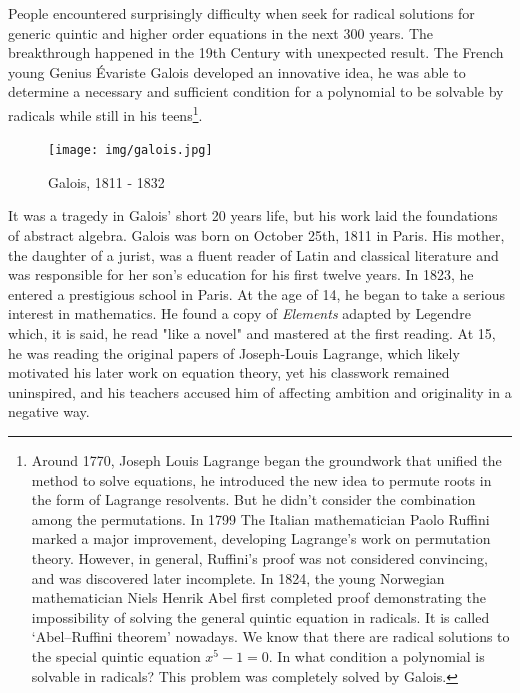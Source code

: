 \documentclass[b5paper]{article}
\begin{document}
People encountered surprisingly difficulty when seek for radical solutions for generic quintic and higher order equations in the next 300 years. The breakthrough happened in the 19th Century with unexpected result. The French young Genius Évariste Galois developed an innovative idea, he was able to determine a necessary and sufficient condition for a polynomial to be solvable by radicals while still in his teens\footnote{Around 1770, Joseph Louis Lagrange began the groundwork that unified the method to solve equations, he introduced the new idea to permute roots in the form of Lagrange resolvents. But he didn't consider the combination among the permutations. In 1799 The Italian mathematician Paolo Ruffini marked a major improvement, developing Lagrange's work on permutation theory. However, in general, Ruffini's proof was not considered convincing, and was discovered later incomplete. In 1824, the young Norwegian mathematician Niels Henrik Abel first completed proof demonstrating the impossibility of solving the general quintic equation in radicals. It is called `Abel–Ruffini theorem' nowadays. We know that there are radical solutions to the special quintic equation $x^5-1=0$. In what condition a polynomial is solvable in radicals? This problem was completely solved by Galois\cite{Wiki-Galois-theory}.}.

\begin{figure}[htbp]
 \centering
 \texttt{[image: img/galois.jpg]}
 \captionsetup{labelformat=empty}
 \caption{Galois, 1811 - 1832}
 \label{fig:Galois}
\end{figure}

It was a tragedy in Galois' short 20 years life, but his work laid the foundations of abstract algebra. Galois was born on October 25th, 1811 in Paris. His mother, the daughter of a jurist, was a fluent reader of Latin and classical literature and was responsible for her son's education for his first twelve years. In 1823, he entered a prestigious school in Paris. At the age of 14, he began to take a serious interest in mathematics. He found a copy of {\em Elements} adapted by Legendre which, it is said, he read "like a novel" and mastered at the first reading. At 15, he was reading the original papers of Joseph-Louis Lagrange, which likely motivated his later work on equation theory, yet his classwork remained uninspired, and his teachers accused him of affecting ambition and originality in a negative way.
\end{document}
